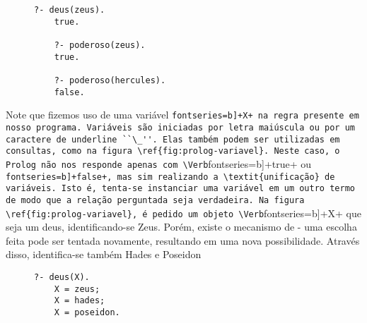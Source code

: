 	\begin{figure}
	\begin{Verbatim}[fontseries=b,gobble=1]
	?- deus(zeus).
	true.
	
	?- poderoso(zeus).
	true.
	
	?- poderoso(hercules).
	false.
	\end{Verbatim}
	\caption{}
	\label{fig:prolog-consulta}
	\end{figure}

	Note que fizemos uso de uma variável \Verb[fontseries=b]+X+ na regra presente em nosso programa. Variáveis são iniciadas por letra maiúscula ou por um caractere de underline ``\_''. Elas também podem ser utilizadas em consultas, como na figura \ref{fig:prolog-variavel}. Neste caso, o Prolog não nos responde apenas com \Verb[fontseries=b]+true+ ou \Verb[fontseries=b]+false+, mas sim realizando a \textit{unificação} de variáveis. Isto é, tenta-se instanciar uma variável em um outro termo de modo que a relação perguntada seja verdadeira. Na figura \ref{fig:prolog-variavel}, é pedido um objeto \Verb[fontseries=b]+X+ que seja um deus, identificando-se Zeus. Porém, existe o mecanismo de  - uma escolha feita pode ser tentada novamente, resultando em uma nova possibilidade. Através disso, identifica-se também Hades e Poseidon \citep[seção ~2.2]{prolog-learnnow}
	
	\begin{figure}[h]
	\begin{Verbatim}[fontseries=b,gobble=1]
	?- deus(X).
	X = zeus;
	X = hades;
	X = poseidon.
	\end{Verbatim}
	\caption{}
	\label{fig:prolog-variavel}
	\end{figure}



%
%
%

